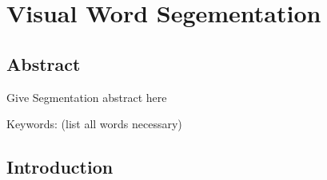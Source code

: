 
\chapter{Visual Word Segementation} %

\label{Chapter3} %

\section{Abstract}

Give Segmentation abstract here

Keywords: (list all words necessary)


\section{Introduction}

